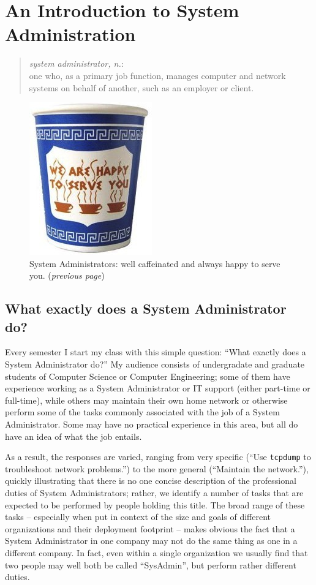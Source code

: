\chapter[Introduction]
{An Introduction to System Administration}
\label{chap:introduction}

\begin{quote}
{\em system administrator, n.}:\\
one who, as a primary job function, manages computer and network systems
on behalf of another, such as an employer or client.\\
\end{quote}

\begin{figure}[hb]
	\raggedleft
	\includegraphics[width=.25\textwidth]{01/pics/we-are-happy-to-serve-you-coffee-mug}
	\caption[Anthora Coffee Cup]{System Administrators: well
		caffeinated and always happy to serve you.
		({\em previous page})
		\label{fig:we-are-happy-to-serve-you}}
\end{figure}

\section{What exactly does a System Administrator do?}
\label{introduction:introduction}

Every semester I start my class with this simple
question: ``What exactly does a System Administrator
do?''  My audience consists of undergradate and
graduate students of Computer Science or Computer
Engineering; some of them have experience working as a
System Administrator or IT support (either part-time
or full-time), while others may maintain their own
home network or otherwise perform some of the tasks
commonly associated with the job of a System
Administrator.  Some may have no practical experience
in this area, but all do have an idea of what the job
entails.

As a result, the responses are varied, ranging from
very specific (``Use \verb+tcpdump+ to troubleshoot
network problems.'') to the more general (``Maintain
the network.''), quickly illustrating that there is no
one concise description of the professional duties of
System Administrators; rather, we identify a number of
tasks that are expected to be performed by people
holding this title.  The broad range of these tasks --
especially when put in context of the size and goals
of different organizations and their deployment
footprint -- makes obvious the fact that a System
Administrator in one company may not do the same thing
as one in a different company.  In fact, even within a
single organization we usually find that two people
may well both be called ``SysAdmin'', but perform
rather different duties.

